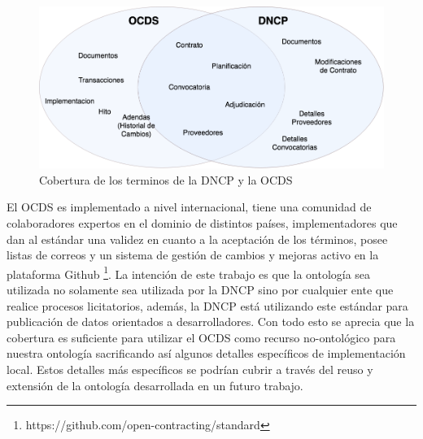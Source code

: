 \begin{figure}[ht!]
    \centering
    \includegraphics[width=150mm]{figuras/Diagramas-VennCobertura.png}
    \caption{Cobertura de los terminos de la DNCP y la OCDS}
    \label{img:coberturaontologia}
\end{figure}

    

El OCDS es implementado a nivel internacional, tiene una comunidad de colaboradores expertos en el dominio de distintos países, implementadores que dan al estándar una validez en cuanto a la aceptación de los términos, posee listas de correos y un sistema de gestión de cambios y mejoras activo en la plataforma Github \footnote{https://github.com/open-contracting/standard}. La intención de este trabajo es que la ontología sea utilizada no solamente sea utilizada por la DNCP sino por cualquier ente que realice procesos licitatorios, además, la DNCP está utilizando este estándar para publicación de datos orientados a desarrolladores. Con todo esto se aprecia que la cobertura es suficiente para utilizar el OCDS como recurso no-ontológico para nuestra ontología sacrificando así algunos detalles específicos de implementación local. Estos detalles más específicos se podrían cubrir a través del reuso y extensión de la ontología desarrollada en un futuro trabajo.

